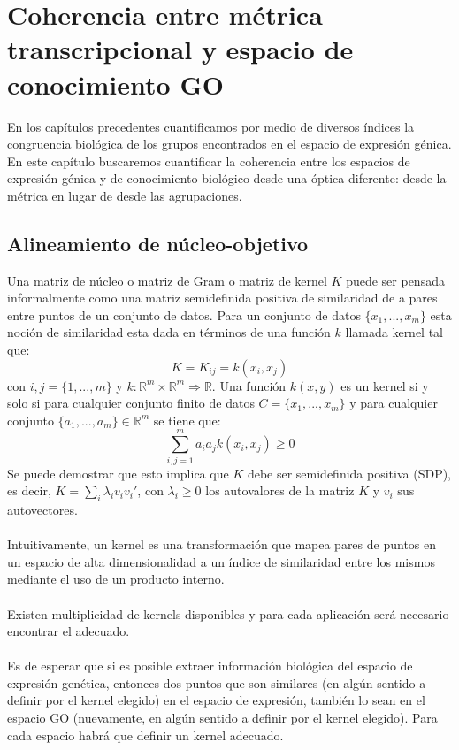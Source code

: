 \chapter{Coherencia entre métrica transcripcional y espacio de conocimiento GO}
En los capítulos precedentes cuantificamos por medio de diversos índices la congruencia biológica de los grupos encontrados en el espacio de expresión génica. En este capítulo buscaremos cuantificar la coherencia entre los espacios de expresión génica y de conocimiento biológico desde una óptica diferente: desde la métrica en lugar de desde las agrupaciones.
\section{Alineamiento de núcleo-objetivo}
Una matriz de núcleo o matriz de Gram o matriz de kernel $K$ puede ser pensada informalmente como una matriz semidefinida positiva de similaridad de a pares entre puntos de un conjunto de datos. Para un conjunto de datos $\{x_1,...,x_m\}$ esta noción de similaridad esta dada en términos de una función $k$ llamada kernel tal que:
\begin{equation}
	K = K_{ij} = k(x_i, x_j)
\end{equation}
con $i,j=\{1,...,m\}$ y $k: \mathbb{R}^m \times \mathbb{R}^m \Rightarrow \mathbb{R}$. Una función $k(x, y)$ es un kernel si y solo si para cualquier conjunto finito de datos $C=\{x_1,...,x_m\}$ y para cualquier conjunto $\{a_1,...,a_m\} \in \mathbb{R}^m$ se tiene que:
\begin{equation}
	\sum_{i,j=1}^m a_ia_jk(x_i, x_j)\geq 0
\end{equation}
Se puede demostrar que esto implica que $K$ debe ser semidefinida positiva (SDP), es decir, $K=\sum_i \lambda _i v_i v_i'$, con $\lambda _i \geq 0$ los autovalores de la matriz $K$ y $v_i$ sus autovectores.\\\\
Intuitivamente, un kernel es una transformación que mapea pares de puntos en un espacio de alta dimensionalidad a un índice de similaridad entre los mismos mediante el uso de un producto interno.\\\\
Existen multiplicidad de kernels disponibles y para cada aplicación será necesario encontrar el adecuado.\\\\
Es de esperar que si es posible extraer información biológica del espacio de expresión genética, entonces dos puntos que son similares (en algún sentido a definir por el kernel elegido) en el espacio de expresión, también lo sean en el espacio GO (nuevamente, en algún sentido a definir por el kernel elegido). Para cada espacio habrá que definir un kernel adecuado.\\\\
